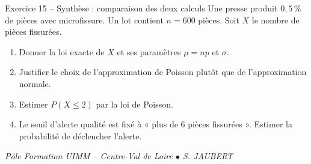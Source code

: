 \documentclass[a4paper,11pt]{article}
\begin{document}
\begin{exo}{Exercice 15 -- Synthèse : comparaison des deux calculs}
Une presse produit $0{,}5\,\%$ de pièces avec microfissure. Un lot contient $n = 600$ pièces. Soit $X$ le nombre de pièces fissurées.
\begin{enumerate}[label=\alph*)]
  \item Donner la loi exacte de $X$ et ses paramètres $\mu = np$ et $\sigma$.
  \item Justifier le choix de l'approximation de Poisson plutôt que de l'approximation normale.
  \item Estimer $P(X \leq 2)$ par la loi de Poisson.
  \item Le seuil d'alerte qualité est fixé à « plus de $6$ pièces fissurées ». Estimer la probabilité de déclencher l'alerte.
\end{enumerate}
\end{exo}

\vfill
\begin{center}\color{uimmgray}\small
\textit{Pôle Formation UIMM -- Centre-Val de Loire $\bullet$ S. JAUBERT}
\end{center}
\end{document}

